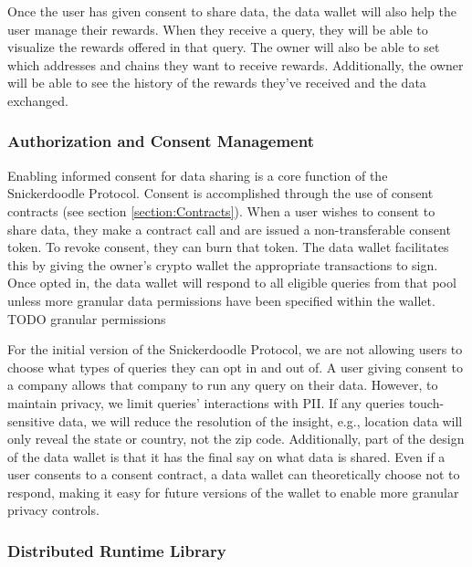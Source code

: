 Once the user has given consent to share data, the data wallet will also help the user manage their rewards. When they receive a query, they will 
be able to visualize the rewards offered in that query. The owner will also be able to set which addresses and chains they want to receive rewards. 
Additionally, the owner will be able to see the history of the rewards they've received and the data exchanged. 

\subsubsection{Authorization and Consent Management}
Enabling informed consent for data sharing is a core function of the Snickerdoodle Protocol. Consent is accomplished through the use of consent contracts 
(see section \ref{section:Contracts}). When a user wishes to consent to share data, they make a contract call and are issued a non-transferable consent 
token. To revoke consent, they can burn that token. The data wallet facilitates this by giving the owner's crypto wallet the appropriate transactions to 
sign. Once opted in, the data wallet will respond to all eligible queries from that pool unless more granular data permissions have been specified within 
the wallet. TODO granular permissions


For the initial version of the Snickerdoodle Protocol, we are not allowing users to choose what types of queries they can opt in and out of. A user giving 
consent to a company allows that company to run any query on their data. However, to maintain privacy, we limit queries' interactions with PII. If any 
queries touch-sensitive data, we will reduce the resolution of the insight, e.g., location data will only reveal the state or country, not the zip code. 
Additionally, part of the design of the data wallet is that it has the final say on what data is shared. Even if a user consents to a consent contract, a 
data wallet can theoretically choose not to respond, making it easy for future versions of the wallet to enable more granular privacy controls.

\subsubsection{Distributed Runtime Library}

